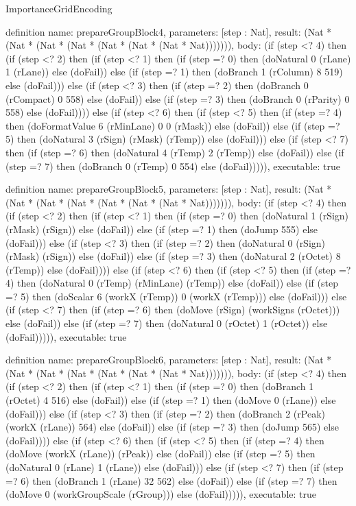 \begin{lexlean}{ImportanceGridEncoding}
\begin{semanticmodule}
definition{
  name: prepareGroupBlock4,
  parameters: [step : Nat],
  result: (Nat * (Nat * (Nat * (Nat * (Nat * (Nat * (Nat * Nat))))))),
  body: (if (step <? 4) then
      (if (step <? 2) then
      (if (step <? 1) then
      (if (step =? 0) then (doNatural 0 (rLane) 1 (rLane)) else (doFail)) else
      (if (step =? 1) then (doBranch 1 (rColumn) 8 519) else (doFail))) else
      (if (step <? 3) then
      (if (step =? 2) then (doBranch 0 (rCompact) 0 558) else (doFail)) else
      (if (step =? 3) then (doBranch 0 (rParity) 0 558) else (doFail)))) else
      (if (step <? 6) then
      (if (step <? 5) then
      (if (step =? 4) then (doFormatValue 6 (rMinLane) 0 0 (rMask)) else (doFail)) else
      (if (step =? 5) then (doNatural 3 (rSign) (rMask) (rTemp)) else (doFail))) else
      (if (step <? 7) then
      (if (step =? 6) then (doNatural 4 (rTemp) 2 (rTemp)) else (doFail)) else
      (if (step =? 7) then (doBranch 0 (rTemp) 0 554) else (doFail))))),
  executable: true
}

definition{
  name: prepareGroupBlock5,
  parameters: [step : Nat],
  result: (Nat * (Nat * (Nat * (Nat * (Nat * (Nat * (Nat * Nat))))))),
  body: (if (step <? 4) then
      (if (step <? 2) then
      (if (step <? 1) then
      (if (step =? 0) then (doNatural 1 (rSign) (rMask) (rSign)) else (doFail)) else
      (if (step =? 1) then (doJump 555) else (doFail))) else
      (if (step <? 3) then
      (if (step =? 2) then (doNatural 0 (rSign) (rMask) (rSign)) else (doFail)) else
      (if (step =? 3) then (doNatural 2 (rOctet) 8 (rTemp)) else (doFail)))) else
      (if (step <? 6) then
      (if (step <? 5) then
      (if (step =? 4) then (doNatural 0 (rTemp) (rMinLane) (rTemp)) else (doFail)) else
      (if (step =? 5) then (doScalar 6 (workX (rTemp)) 0 (workX (rTemp))) else (doFail))) else
      (if (step <? 7) then
      (if (step =? 6) then (doMove (rSign) (workSigns (rOctet))) else (doFail)) else
      (if (step =? 7) then (doNatural 0 (rOctet) 1 (rOctet)) else (doFail))))),
  executable: true
}

definition{
  name: prepareGroupBlock6,
  parameters: [step : Nat],
  result: (Nat * (Nat * (Nat * (Nat * (Nat * (Nat * (Nat * Nat))))))),
  body: (if (step <? 4) then
      (if (step <? 2) then
      (if (step <? 1) then
      (if (step =? 0) then (doBranch 1 (rOctet) 4 516) else (doFail)) else
      (if (step =? 1) then (doMove 0 (rLane)) else (doFail))) else
      (if (step <? 3) then
      (if (step =? 2) then (doBranch 2 (rPeak) (workX (rLane)) 564) else (doFail)) else
      (if (step =? 3) then (doJump 565) else (doFail)))) else
      (if (step <? 6) then
      (if (step <? 5) then
      (if (step =? 4) then (doMove (workX (rLane)) (rPeak)) else (doFail)) else
      (if (step =? 5) then (doNatural 0 (rLane) 1 (rLane)) else (doFail))) else
      (if (step <? 7) then
      (if (step =? 6) then (doBranch 1 (rLane) 32 562) else (doFail)) else
      (if (step =? 7) then (doMove 0 (workGroupScale (rGroup))) else (doFail))))),
  executable: true
}


\end{semanticmodule}
\end{lexlean}
